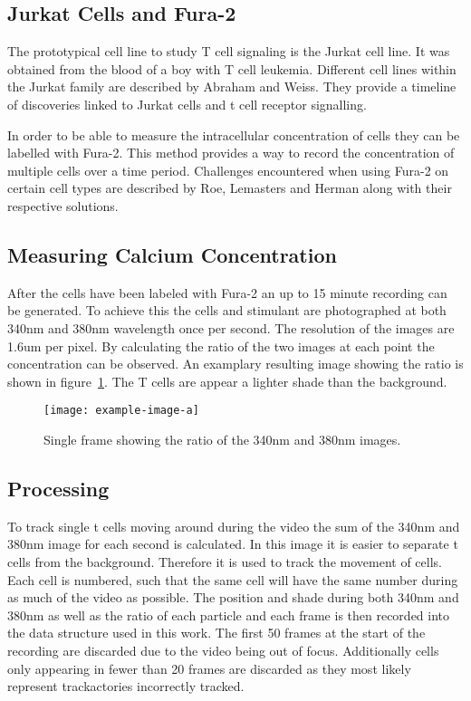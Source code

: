 \subsection{Jurkat Cells and Fura-2}

The prototypical cell line to study T cell signaling is the Jurkat cell line.\cite{morgan2023} It was obtained from the blood of a boy with T cell leukemia.\cite{schneider1977} Different cell lines within the Jurkat family are described by Abraham and Weiss.\cite{abraham2004} They provide a timeline of discoveries linked to Jurkat cells and t cell receptor signalling.

In order to be able to measure the intracellular \Calcium concentration of cells they can be labelled with Fura-2. This method provides a way to record the \Calcium concentration of multiple cells over a time period.\cite{martinez2017} Challenges encountered when using Fura-2 on certain cell types are described by Roe, Lemasters and Herman along with their respective solutions.\cite{roe1990}

\subsection{Measuring Calcium Concentration}

After the cells have been labeled with Fura-2 an up to 15 minute recording can be generated. To achieve this the cells and stimulant are photographed at both 340nm and 380nm wavelength once per second. The resolution of the images are 1.6um per pixel. By calculating the ratio of the two images at each point the \Calcium concentration can be observed. An examplary resulting image showing the ratio is shown in figure~\ref{fig:example_ratio_img}. The T cells are appear a lighter shade than the background.

\begin{figure}
	\centering
	\texttt{[image: example-image-a]}
	\caption{Single frame showing the ratio of the 340nm and 380nm images.}
	\label{fig:example_ratio_img}
\end{figure}


\subsection{Processing}

To track single t cells moving around during the video the sum of the 340nm and 380nm image for each second is calculated. In this image it is easier to separate t cells from the background. Therefore it is used to track the movement of cells. Each cell is numbered, such that the same cell will have the same number during as much of the video as possible. The position and shade during both 340nm and 380nm as well as the ratio of each particle and each frame is then recorded into the data structure used in this work. The first 50 frames at the start of the recording are discarded due to the video being out of focus. Additionally cells only appearing in fewer than 20 frames are discarded as they most likely represent trackactories incorrectly tracked.
